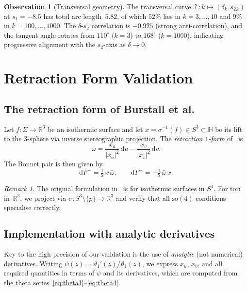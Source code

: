 \documentclass[11pt,a4paper]{article}
\theoremstyle{plain}
\theoremstyle{definition}
\newtheorem{observation}[theorem]{Observation}
\theoremstyle{remark}
\newtheorem{remark}[theorem]{Remark}
\newcommand{\vt}[1]{\vartheta_{#1}}     %
\newcommand{\RR}{\mathbb{R}}
\newcommand{\HH}{\mathbb{H}}            %
\newcommand{\dd}{\mathrm{d}}
\newcommand{\abs}[1]{\lvert #1 \rvert}
\begin{document}
\begin{observation}[Transversal geometry]
\label{obs:transversal}
The transversal curve $\mathcal{T}\colon k \mapsto
(\delta_k, s_2{}_k)$ at $s_1 = -8.5$ has total arc
length~$5.82$, of which $52\%$ lies in $k = 3,\ldots,10$
and $9\%$ in $k = 100,\ldots,1000$.  The $\delta$-$s_2$
correlation is $-0.925$ (strong anti-correlation), and
the tangent angle rotates from $110^\circ$ ($k=3$)
to $168^\circ$ ($k=1000$), indicating progressive
alignment with the $s_2$-axis as $\delta \to 0$.
\end{observation}


\section{Retraction Form Validation}\label{sec:retraction}

\subsection{The retraction form of Burstall et al.}
\label{sec:retraction-theory}
Let $f \colon \Sigma \to \RR^3$ be an isothermic surface and let
$x = \sigma^{-1}(f) \in S^3 \subset \HH$ be its lift to the
$3$-sphere via inverse stereographic projection.  The
\emph{retraction $1$-form} of~\cite{BCHR25} is
\begin{equation}
  \omega = \frac{x_u}{\abs{x_u}^2}\,\dd u
    - \frac{x_v}{\abs{x_v}^2}\,\dd v.
  \label{eq:omega}
\end{equation}
The Bonnet pair is then given by
\begin{equation}
  \dd F^+ = \tfrac12\,x\,\bar\omega,
  \qquad
  \dd F^- = -\tfrac12\,\bar{\omega}\,x.
  \label{eq:Fpm}
\end{equation}

\begin{remark}
  The original formulation in~\cite{BCHR25} is for isothermic
  surfaces in $S^4$.  For tori in~$\RR^3$, we project via
  $\sigma \colon S^3 \setminus \{p\} \to \RR^3$ and verify that
  all $\mathrm{so}(4)$ conditions specialise correctly.
\end{remark}

\subsection{Implementation with analytic derivatives}
\label{sec:retraction-impl}
Key to the high precision of our validation is the use of
\emph{analytic} (not numerical) derivatives.  Writing
$\psi(z) = \vt{1}'(z)/\vt{1}(z)$, we express $x_u$, $x_v$, and all
required quantities in terms of $\psi$ and its derivatives, which are
computed from the theta series~\eqref{eq:theta1}--\eqref{eq:theta4}.
\end{document}
